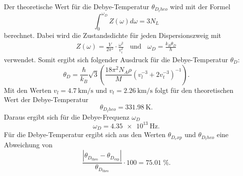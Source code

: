 Der theoretische Wert für die Debye-Temperatur $\theta_{D_theo}$ wird mit der Formel
\begin{equation}
  \int_{0}^{\omega_D} Z(\omega) d\omega = 3N_L
\end{equation}
berechnet. Dabei wird die Zustandsdichte für jeden Dispersionszweig mit
\begin{align}
  Z(\omega)= \frac{V}{2\pi^2}\cdot\frac{\omega^2}{v_i^2}\:\:\:\:\text{und}\:\:\:\:
  \omega_D=\frac{k_B \theta_D}{\hbar}
\end{align}
verwendet.
Somit ergibt sich folgender Ausdruck für die Debye-Temperatur $\theta_D$:
\begin{equation}
  \theta_D=\frac{\hbar}{k_B}\sqrt{3}(\frac{18\pi^2 N_A \rho}{M}(v_l^{-3}+2v_t^{-3})^{-1}).
\end{equation}
Mit den Werten $v_l=\SI{4.7}{\km\per\s}$ und $v_t=\SI{2.26}{\km\per\s}$ folgt für
den theoretischen Wert der Debye-Temperatur
\begin{equation}
  \theta_{D_theo}=\SI{331.98}{\K}.
\end{equation}
Daraus ergibt sich für die Debye-Frequenz $\omega_D$
\begin{equation}
  \omega_D=\SI{4.35e13}{\Hz}.
\end{equation}
Für die Debye-Temperatur ergibt sich aus den Werten $\theta_{D_exp}$ und $\theta_{D_theo}$
eine Abweichung von
\begin{equation}
  \frac{|\theta_{D_\text{theo}}-\theta_{D_\text{exp}}|}{\theta_{D_\text{theo}}}\cdot 100=75.01\;\%.
\end{equation}
